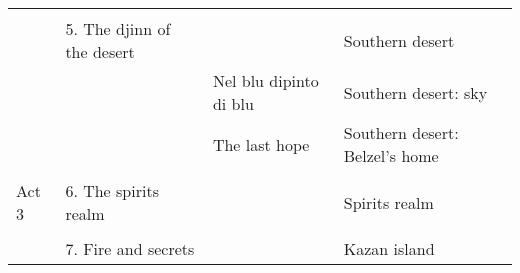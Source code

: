 \begin{table}[H]
{\begin{tabular}{|llll|}
\multicolumn{1}{|l|}{} &  &  &  \\ \cline{2-4} 
\multicolumn{1}{|l|}{} & \multicolumn{1}{l|}{5. The djinn of the desert} & \multicolumn{1}{l|}{} & Southern desert \\ \cline{2-4} 
\multicolumn{1}{|l|}{} & \multicolumn{1}{l|}{} & \multicolumn{1}{l|}{Nel blu dipinto di blu} & Southern desert: sky \\ \cline{3-4} 
\multicolumn{1}{|l|}{} & \multicolumn{1}{l|}{} & \multicolumn{1}{l|}{The last hope} & Southern desert: Belzel's home \\ \hline
 &  &  &  \\ \hline
\multicolumn{1}{|l|}{\cellcolor[HTML]{C0C0C0}Act 3} & \multicolumn{1}{l|}{6. The spirits realm} & \multicolumn{1}{l|}{} & Spirits realm \\ \hline
\multicolumn{1}{|l|}{} &  &  &  \\ \cline{2-4} 
\multicolumn{1}{|l|}{} & \multicolumn{1}{l|}{7. Fire and secrets} & \multicolumn{1}{l|}{} & Kazan island \\ \hline

\end{tabular}%
}
\end{table}